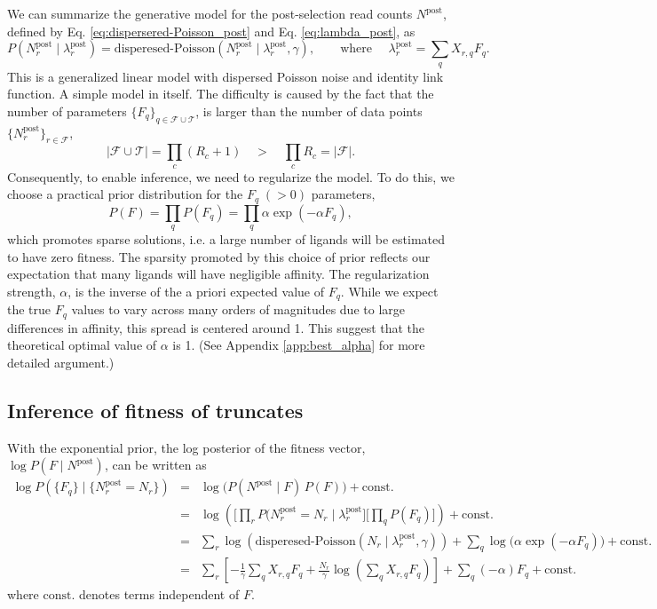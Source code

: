 \documentclass[letter,10pt,oneside]{article}
\newcommand{\bel}{\begin{equation}}
\newcommand{\eel}{\end{equation}}
\newcommand{\bal}{\begin{eqnarray}}
\newcommand{\eal}{\end{eqnarray}}
\newcommand{\+}{^\dagger}
\newcommand{\refeq}[1]{Eq. \ref{#1}}
\begin{document}
We can summarize the generative model for the post-selection read counts $N^\text{post}$, defined by \refeq{eq:dispersered-Poisson_post} and \refeq{eq:lambda_post}, as
\bel
  P(N_r^\text{post}\;|\;\lambda_r^\text{post}) = \text{disperesed-Poisson}(N_r^\text{post}\;|\;\lambda_r^\text{post}, \gamma), \qquad \text{where }\quad  \lambda_r^\text{post} = \sum_q X_{r,q} F_q.
\eel
This is a generalized linear model with dispersed Poisson noise and identity link function. A simple model in itself. The difficulty is caused by the fact that the number of parameters $\{F_q\}_{q \in \mathcal{F} \cup \mathcal{T}}$, is larger than the number of data points $\{N^\text{post}_r\}_{r \in \mathcal{F}}$,
\bel
  |\mathcal{F} \cup \mathcal{T}| = \prod_c (R_c + 1) \quad >\quad  \prod_c R_c = |\mathcal{F}|.
\eel
Consequently, to enable inference, we need to regularize the model. To do this, we choose a practical prior distribution for the $F_q \;(>0)$  parameters, 
\bel
\label{eq:prior}
  P(F) = \prod_q P(F_q) = \prod_q \alpha \exp(-\alpha F_q),
\eel
which promotes sparse solutions, i.e. a large number of ligands will be estimated to have zero fitness. The sparsity promoted by this choice of prior reflects our expectation that many ligands will have negligible affinity. The regularization strength, $\alpha$, is the inverse of the a priori expected value of $F_q$. While we expect the true $F_q$ values to vary across many orders of magnitudes due to large differences in affinity, this spread is centered around 1. This suggest that the theoretical optimal value of $\alpha$ is 1. (See Appendix \ref{app:best_alpha} for more detailed argument.)


\subsection{Inference of fitness of truncates}

With the exponential prior, the log posterior of the fitness vector, $\log P(F\;|\;N^\text{post})$, can be written as
\bal
  \log P(\{F_q\}\;|\;\{N_r^\text{post} = N_r\}) &=& \log \Big(P(N^\text{post}\;|\; F) \,P(F)\Big)  + \text{const.} \\
  &=& \log\left(\Big[\prod_r P(N_r^\text{post} = N_r\;|\;\lambda_r^\text{post}\Big]\Big[\prod_q P(F_q)\Big]\right) + \text{const.}\\
  &=& \sum_r \log\left(\text{disperesed-Poisson}(N_r\;|\;\lambda_r^\text{post}, \gamma)\right) + \sum_q \log \Big(\alpha \exp(-\alpha F_q)\Big) + \text{const.}\\
  &=& \sum_r \left[-\frac{1}{\gamma} \sum_q X_{r,q}F_q + \frac{N_r}{\gamma}\log\left(\sum_q X_{r,q}F_q\right)\right] + \sum_q (-\alpha) F_q + \text{const.}
  \label{eq:log_posterior_full_F}
\eal
where $\text{const.}$ denotes terms independent of $F$. 
\end{document}
